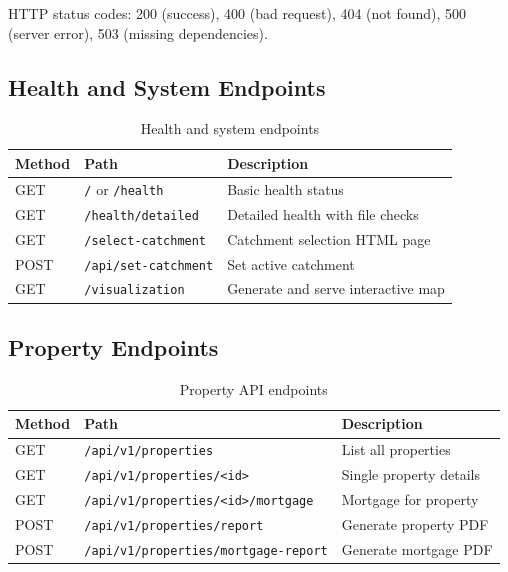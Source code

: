 \documentclass[11pt,a4paper]{article}
\begin{document}
HTTP status codes: 200 (success), 400 (bad request), 404 (not found),
500 (server error), 503 (missing dependencies).

\subsection{Health and System Endpoints}

\begin{table}[H]
    \centering
    \caption{Health and system endpoints}
    \begin{tabular}{@{}lll@{}}
        \toprule
        \textbf{Method} & \textbf{Path} & \textbf{Description} \\
        \midrule
        GET  & \texttt{/} or \texttt{/health}     & Basic health status \\
        GET  & \texttt{/health/detailed}           & Detailed health with file checks \\
        GET  & \texttt{/select-catchment}          & Catchment selection HTML page \\
        POST & \texttt{/api/set-catchment}         & Set active catchment \\
        GET  & \texttt{/visualization}             & Generate and serve interactive map \\
        \bottomrule
    \end{tabular}
\end{table}

\subsection{Property Endpoints}

\begin{table}[H]
    \centering
    \caption{Property API endpoints}
    \begin{tabular}{@{}lll@{}}
        \toprule
        \textbf{Method} & \textbf{Path} & \textbf{Description} \\
        \midrule
        GET  & \texttt{/api/v1/properties}                   & List all properties \\
        GET  & \texttt{/api/v1/properties/<id>}               & Single property details \\
        GET  & \texttt{/api/v1/properties/<id>/mortgage}      & Mortgage for property \\
        POST & \texttt{/api/v1/properties/report}             & Generate property PDF \\
        POST & \texttt{/api/v1/properties/mortgage-report}    & Generate mortgage PDF \\
        \bottomrule
    \end{tabular}
\end{table}
\end{document}
